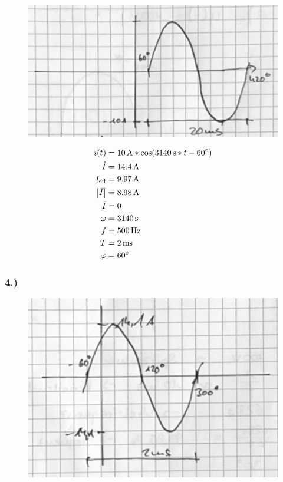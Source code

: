 \documentclass[../../document.tex]{subfiles}
\begin{document}
\begin{figure}[H]
    \begin{center}
        \includegraphics[width=.9\linewidth]{../../img/aufg1-a-3}
    \end{center}
\end{figure}

\begin{equation*}
    \begin{split}
        i(t) &= \SI{10}{\ampere} * \cos(\SI{3140}{\second} * t - \SI{60}{\degree})\\
        \hat{I} &= \SI{14,4}{\ampere}\\
        I_{\textrm{eff}} &= \SI{9,97}{\ampere}\\
        \left\lvert\bar{I}\right\rvert &= \SI{8,98}{\ampere}\\
        \bar{I} &= 0\\
        \omega &= \SI{3140}{\second}\\
        f &= \SI{500}{\hertz}\\
        T &= \SI{2}{ms}\\
        \varphi &= \SI{60}{\degree}\\
    \end{split}
\end{equation*}

\newpage

\subsubsection*{4.)}

\begin{figure}[H]
    \begin{center}
        \includegraphics[width=.9\linewidth]{../../img/aufg1-a-4}
    \end{center}
\end{figure}
\end{document}
